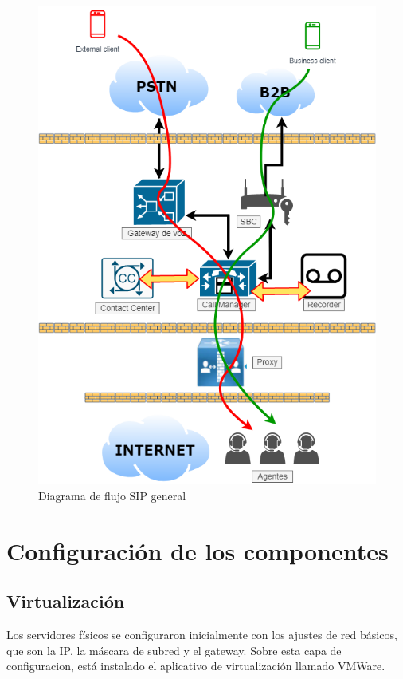 \documentclass[a4paper, 12pt]{book}
\begin{document}
\begin{figure}[!]
  \centering
  \includegraphics[scale=0.6]{img/fig_callflow}
  \caption{Diagrama de flujo SIP general}
  \label{figura:fig_callflow}
\end{figure}

\section{Configuración de los componentes}
\label{sec:config}

\subsection{Virtualización}
\label{sec:vmware}
Los servidores físicos se configuraron inicialmente con los ajustes de red básicos, que son la IP, la máscara de subred y el gateway. Sobre esta capa de configuracion, está instalado el aplicativo de virtualización llamado VMWare. 
\end{document}

